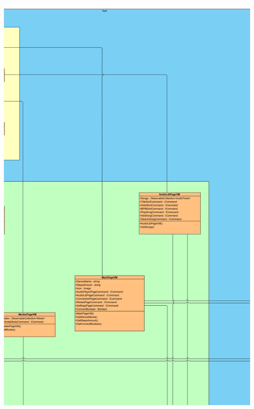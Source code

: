 \documentclass[../entwurf.tex]{subfiles}
\begin{document}
\includegraphics[scale=0.12]{../graphics/uml_diagramme/Gesamt/2.png}
\newpage
\end{document}
